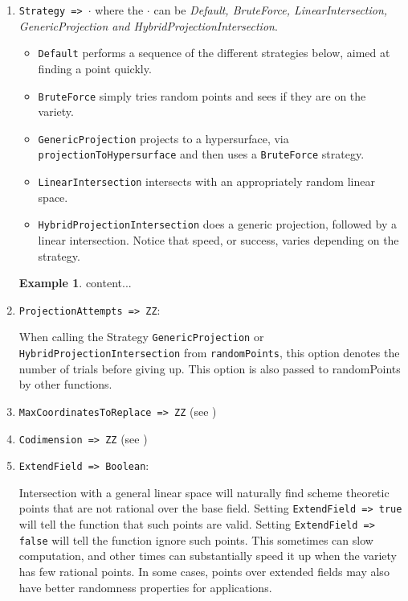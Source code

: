 \documentclass[11pt]{amsart}
\theoremstyle{definition}
\newtheorem{example}{Example}[section]
\begin{document}
\begin{enumerate}
	\vspace{1em}
	
\item {\tt Strategy => $\cdot$} where the $\cdot$ can be \textit{Default, BruteForce, LinearIntersection, GenericProjection and  HybridProjectionIntersection}.

\begin{itemize}
    \item {\tt Default} performs a sequence of the different strategies below, aimed at finding a point quickly.    
	\item {\tt BruteForce} simply tries random points and sees if they are on the variety.
	
	\item {\tt GenericProjection} projects to a hypersurface, via 
	{\tt projectionToHypersurface} and then uses a {\tt BruteForce} strategy.
	
	\item {\tt LinearIntersection} intersects with an appropriately random linear space.
	
	\item {\tt HybridProjectionIntersection} does a generic projection, followed by a linear intersection. Notice that speed, or success, varies depending on the strategy.
		
\end{itemize}

\begin{example}
	content...
\end{example}
	
\item {\tt ProjectionAttempts => ZZ}: 

When calling the Strategy {\tt GenericProjection} or {\tt HybridProjectionIntersection} from {\tt randomPoints}, this option denotes the number of trials before giving up.  This option is also passed to randomPoints by other functions.


\item {\tt MaxCoordinatesToReplace => ZZ} (see )

\vspace{1em}
\item {\tt Codimension => ZZ} (see )

\vspace{1em}
\item {\tt ExtendField => Boolean}: 

Intersection with a general linear space will naturally find scheme theoretic points that are not rational over the base field.  
Setting {\tt ExtendField => true} will tell the function that such points are valid.  Setting {\tt ExtendField => false} will tell the function ignore such points.  This sometimes can slow computation, and other times can substantially speed it up when the variety has few rational points.  In some cases, points over extended fields may also have better randomness properties for applications.


\end{enumerate}
\end{document}

